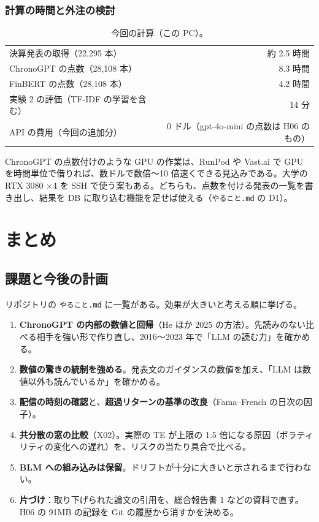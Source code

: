 \documentclass[xelatex,ja=standard,jafont=haranoaji,a4paper,10pt]{bxjsreport}
\newcommand{\code}[1]{\texttt{#1}}
\begin{document}
\section{計算の時間と外注の検討}

\begin{table}[H]
\centering
\caption{今回の計算（この PC）。}
\small
\begin{tabular}{lr}
\toprule
決算発表の取得（22,295 本） & 約 2.5 時間 \\
ChronoGPT の点数（28,108 本） & 8.3 時間 \\
FinBERT の点数（28,108 本） & 4.2 時間 \\
実験 2 の評価（TF-IDF の学習を含む） & 14 分 \\
API の費用（今回の追加分） & 0 ドル（gpt-4o-mini の点数は H06 のもの） \\
\bottomrule
\end{tabular}
\end{table}

ChronoGPT の点数付けのような GPU の作業は、RunPod や Vast.ai で GPU を時間単位で借りれば、数ドルで数倍〜10 倍速くできる見込みである。大学の RTX 3080 ×4 を SSH で使う案もある。どちらも、点数を付ける発表の一覧を書き出し、結果を DB に取り込む機能を足せば使える（\code{やること.md} の D1）。

\part{まとめ}

\chapter{課題と今後の計画}\label{ch:future}

リポジトリの \code{やること.md} に一覧がある。効果が大きいと考える順に挙げる。

\begin{enumerate}
\item \textbf{ChronoGPT の内部の数値と回帰}（He ほか 2025 の方法）。先読みのない比べる相手を強い形で作り直し、2016〜2023 年で「LLM の読む力」を確かめる。
\item \textbf{数値の驚きの統制を強める}。発表文のガイダンスの数値を加え、「LLM は数値以外も読んでいるか」を確かめる。
\item \textbf{配信の時刻の確認}と、\textbf{超過リターンの基準の改良}（Fama--French の日次の因子）。
\item \textbf{共分散の窓の比較}（X02）。実際の TE が上限の 1.5 倍になる原因（ボラティリティの変化への遅れ）を、リスクの当たり具合で比べる。
\item \textbf{BLM への組み込みは保留}。ドリフトが十分に大きいと示されるまで行わない。
\item \textbf{片づけ}：取り下げられた論文の引用を、総合報告書 1 などの資料で直す。H06 の 91MB の記録を Git の履歴から消すかを決める。
\end{enumerate}
\end{document}
